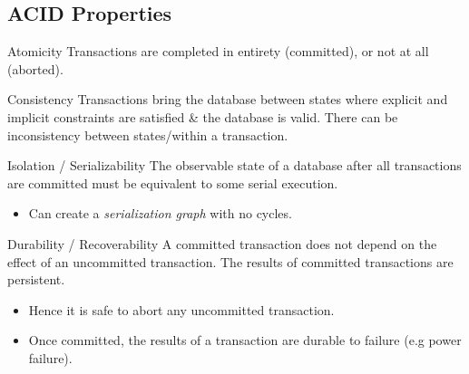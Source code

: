 \subsection{ACID Properties}

\begin{definitionbox}{Atomicity}
    Transactions are completed in entirety (committed), or not at all (aborted).
\end{definitionbox}
\begin{definitionbox}{Consistency}
    Transactions bring the database between states where explicit and implicit constraints are satisfied \& the database is valid. There can be inconsistency between states/within a transaction.
\end{definitionbox}
\begin{definitionbox}{Isolation / Serializability}
    The observable state of a database after all transactions are committed must be equivalent to some serial execution.
    \begin{itemize}
        \item Can create a \textit{serialization graph} with no cycles.
    \end{itemize}
\end{definitionbox}

\begin{definitionbox}{Durability / Recoverability}
    A committed transaction does not depend on the effect of an uncommitted transaction. The results of committed transactions are persistent.
    \begin{itemize}
        \item Hence it is safe to abort any uncommitted transaction.
        \item Once committed, the results of a transaction are durable to failure (e.g power failure).
    \end{itemize}
\end{definitionbox}

